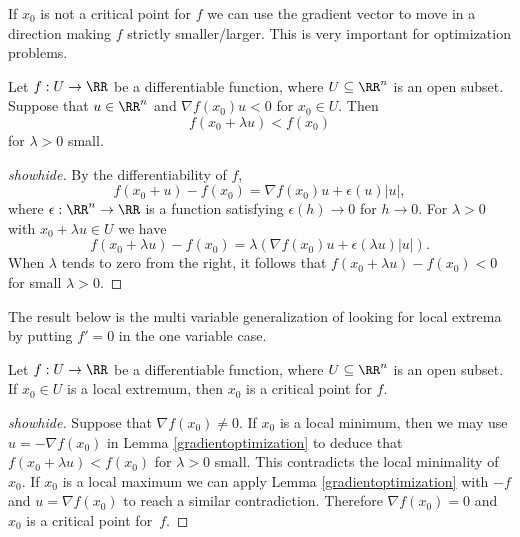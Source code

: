 \documentclass{article}
\begin{document}
If $x_0$ is not a critical point for $f$ we can use the gradient
vector to move in a direction making $f$ strictly smaller/larger. This is
very important for optimization problems.



\begin{lemma}[emph]\label{gradientoptimization}
  Let $f: U\rightarrow \RR$ be a differentiable function, where
  $U\subseteq \RR^n$ is an open subset. Suppose that $u\in \RR^n$ and
  $\nabla f(x_0) u < 0$ for $x_0\in U$. Then
  \begin{equation*}
    f(x_0 + \lambda u) < f(x_0)
  \end{equation*}
  for $\lambda > 0$ small.
\end{lemma}
\begin{proof}[showhide]
  By the differentiability of $f$,
  \begin{equation*}
    f(x_0 + u) - f(x_0) = \nabla f(x_0) u + \epsilon(u) |u|,
  \end{equation*}
  where $\epsilon:\RR^n \rightarrow \RR$ is a function satisfying
  $\epsilon(h) \rightarrow 0$ for $h\rightarrow 0$. For $\lambda > 0$
  with $x_0 + \lambda u\in U$ we have
  \begin{equation*}
    f(x_0 + \lambda u) - f(x_0) = \lambda (\nabla f(x_0) u +
    \epsilon(\lambda u) 
    | u |).
  \end{equation*}
  When $\lambda$ tends to zero from the right, it follows that $f(x_0 + \lambda u) - f(x_0) <
  0$ for small $\lambda > 0$.
\end{proof}


The result below is the multi variable generalization of looking for
local extrema by putting $f'=0$ in the one variable case.

\begin{proposition}[emph]\label{locopt}
  Let $f: U\rightarrow \RR$ be a differentiable function, where
  $U\subseteq \RR^n$ is an open subset. If $x_0\in U$ is a local
  extremum, then $x_0$ is a critical point for $f$.
\end{proposition}
\begin{proof}[showhide]
  Suppose that $\nabla f(x_0)\neq 0$.  If $x_0$ is a local minimum,
  then we may use $u = -\nabla f(x_0)$ in
  Lemma \ref{gradientoptimization} to deduce that $f(x_0 + \lambda u) <
  f(x_0)$ for $\lambda>0$ small. This contradicts the local minimality
  of $x_0$.  If $x_0$ is a local maximum we can apply
  Lemma \ref{gradientoptimization} with $-f$ and $u = \nabla f(x_0)$
  to reach a similar contradiction.  Therefore $\nabla f(x_0)=0$ and
  $x_0$ is a critical point for~$f$.
\end{proof}
\end{document}
